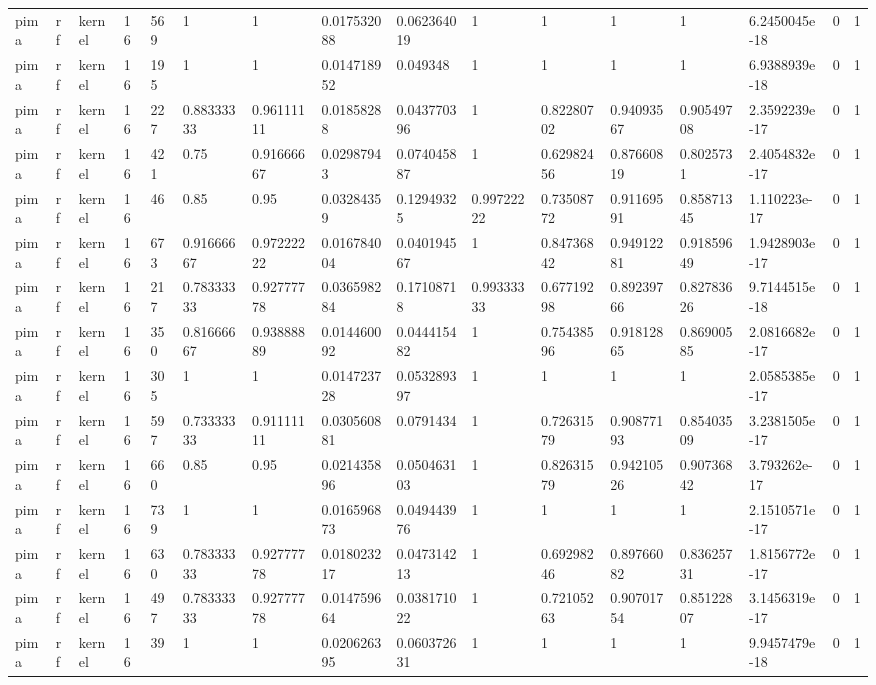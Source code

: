 \begin{tabular}{llllllllllllllll}
pima & rf & kernel & 16 & 569 & 1 & 1 & 0.017532088 & 0.062364019 & 1 & 1 & 1 & 1 & 6.2450045e-18 & 0 & 1 \\
pima & rf & kernel & 16 & 195 & 1 & 1 & 0.014718952 & 0.049348 & 1 & 1 & 1 & 1 & 6.9388939e-18 & 0 & 1 \\
pima & rf & kernel & 16 & 227 & 0.88333333 & 0.96111111 & 0.01858288 & 0.043770396 & 1 & 0.82280702 & 0.94093567 & 0.90549708 & 2.3592239e-17 & 0 & 1 \\
pima & rf & kernel & 16 & 421 & 0.75 & 0.91666667 & 0.02987943 & 0.074045887 & 1 & 0.62982456 & 0.87660819 & 0.8025731 & 2.4054832e-17 & 0 & 1 \\
pima & rf & kernel & 16 & 46 & 0.85 & 0.95 & 0.03284359 & 0.12949325 & 0.99722222 & 0.73508772 & 0.91169591 & 0.85871345 & 1.110223e-17 & 0 & 1 \\
pima & rf & kernel & 16 & 673 & 0.91666667 & 0.97222222 & 0.016784004 & 0.040194567 & 1 & 0.84736842 & 0.94912281 & 0.91859649 & 1.9428903e-17 & 0 & 1 \\
pima & rf & kernel & 16 & 217 & 0.78333333 & 0.92777778 & 0.036598284 & 0.17108718 & 0.99333333 & 0.67719298 & 0.89239766 & 0.82783626 & 9.7144515e-18 & 0 & 1 \\
pima & rf & kernel & 16 & 350 & 0.81666667 & 0.93888889 & 0.014460092 & 0.044415482 & 1 & 0.75438596 & 0.91812865 & 0.86900585 & 2.0816682e-17 & 0 & 1 \\
pima & rf & kernel & 16 & 305 & 1 & 1 & 0.014723728 & 0.053289397 & 1 & 1 & 1 & 1 & 2.0585385e-17 & 0 & 1 \\
pima & rf & kernel & 16 & 597 & 0.73333333 & 0.91111111 & 0.030560881 & 0.0791434 & 1 & 0.72631579 & 0.90877193 & 0.85403509 & 3.2381505e-17 & 0 & 1 \\
pima & rf & kernel & 16 & 660 & 0.85 & 0.95 & 0.021435896 & 0.050463103 & 1 & 0.82631579 & 0.94210526 & 0.90736842 & 3.793262e-17 & 0 & 1 \\
pima & rf & kernel & 16 & 739 & 1 & 1 & 0.016596873 & 0.049443976 & 1 & 1 & 1 & 1 & 2.1510571e-17 & 0 & 1 \\
pima & rf & kernel & 16 & 630 & 0.78333333 & 0.92777778 & 0.018023217 & 0.047314213 & 1 & 0.69298246 & 0.89766082 & 0.83625731 & 1.8156772e-17 & 0 & 1 \\
pima & rf & kernel & 16 & 497 & 0.78333333 & 0.92777778 & 0.014759664 & 0.038171022 & 1 & 0.72105263 & 0.90701754 & 0.85122807 & 3.1456319e-17 & 0 & 1 \\
pima & rf & kernel & 16 & 39 & 1 & 1 & 0.020626395 & 0.060372631 & 1 & 1 & 1 & 1 & 9.9457479e-18 & 0 & 1 \\

\end{tabular}
